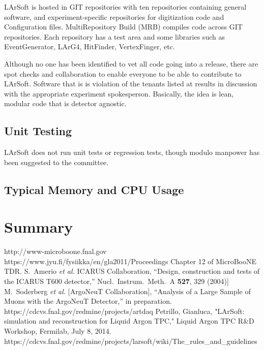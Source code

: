 \documentclass[12pt]{elsarticle}
\begin{document}
LArSoft is hosted in GIT repositories with ten repositories containing general software, and experiment-specific repositories for digitization code and Configuration files. MultiRepository Build (MRB) compiles code across GIT repositories. Each repository has a test area and some libraries such as EventGenerator, LArG4, HitFinder, VertexFinger, etc.\cite{gian}

Although no one has been identified to vet all code going into a release, there are spot checks and collaboration to enable everyone to be able to contribute to LArSoft. Software that is is violation of the tenants listed at \cite{code tenants} results in discussion with the appropriate experiment spokesperson. Basically, the idea is lean, modular code that is detector agnostic.  

\subsection{Unit Testing}
LArSoft does not run unit tests or regression tests, though modulo manpower has been suggested to the committee.

\subsection{Typical Memory and CPU Usage}

\section{Summary}


\begin{thebibliography}{99}
 http://www-microboone.fnal.gov
https://www.jyu.fi/fysiikka/en/gla2011/Proceedings
Chapter 12 of MicroBooNE TDR.
 S.~Amerio {\it et al.}  ICARUS Collaboration,
  ``Design, construction and tests of the ICARUS T600 detector,''
  Nucl.\ Instrum.\ Meth.\ A {\bf 527}, 329 (2004)]
 M.~Soderberg {\it et al.}  [ArgoNeuT Collaboration],
  ``Analysis of a Large Sample of Muons with the ArgoNeuT Detector,''
  in preparation.
 https://cdcvs.fnal.gov/redmine/projects/artdaq
 Petrillo, Gianluca, "LArSoft: simulation and reconstruction for Liquid Argon TPC," Liquid Argon TPC R\&D Workshop, Fermilab, July 8, 2014.
 https://cdcvs.fnal.gov/redmine/projects/larsoft/wiki/The\_rules\_and\_guidelines
\end{thebibliography}
\clearpage 

\tableofcontents
\end{document}
